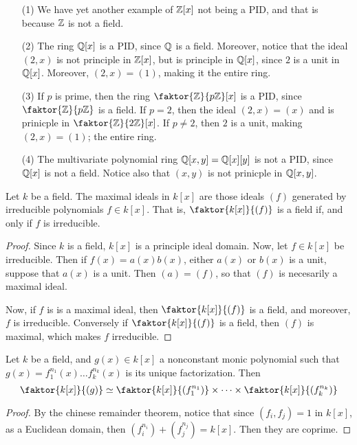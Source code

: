 \begin{example}\label{example_7.7}
  \begin{enumerate}
    \item[(1)] We have yet another example of $\mathbb{Z}[x]$ not being a PID, and
      that is because $\mathbb{Z}$ is not a field.

    \item[(2)] The ring $\mathbb{Q}[x]$ is a PID, since $\mathbb{Q}$ is a field. Moreover,
      notice that the ideal $(2,x)$ is not principle in $\mathbb{Z}[x]$, but is
      principle in $\mathbb{Q}[x]$, since $2$ is a unit in  $\mathbb{Q}[x]$. Moreover,
      $(2,x)=(1)$, making it the entire ring.

    \item[(3)] If $p$ is prime, then the ring  $\faktor{\Z}{p\Z}[x]$ is a
      PID, since $\faktor{\Z}{p\Z}$ is a field. If $p=2$, then the ideal
      $(2,x)=(x)$ and is prinicple in $\faktor{\Z}{2\Z}[x]$. If $p \neq 2$,
      then  $2$ is a unit, making  $(2,x)=(1)$; the entire ring.

    \item[(4)] The multivariate polynomial ring $\mathbb{Q}[x,y]=\mathbb{Q}[x][y]$ is not a
      PID, since $\mathbb{Q}[x]$ is not a field. Notice also that $(x,y)$ is not
      prinicple in $\mathbb{Q}[x,y]$.
  \end{enumerate}
\end{example}

\begin{proposition}\label{proposition_7.4.2}
  Let $k$ be a field. The maximal ideals in $k[x]$ are those ideals $(f)$
  generated by irreducible polynomials $f \in k[x]$. That is,
  $\faktor{k[x]}{(f)}$ is a field if, and only if $f$ is irreducible.
\end{proposition}
\begin{proof}
  Since $k$ is a field, $k[x]$ is a principle ideal domain. Now, let
  $f \in k[x]$ be irreducible. Then if $f(x)=a(x)b(x)$, either
  $a(x)$ or $b(x)$ is a unit, suppose that $a(x)$ is a unit. Then
  $(a)=(f)$, so that $(f)$ is necesarily a maximal ideal.

  Now, if $f$ is is a maximal ideal, then $\faktor{k[x]}{(f)}$ is a
  field, and moreover, $f$ is irreducible. Conversely if
  $\faktor{k[x]}{(f)}$ is a field, then $(f)$ is maximal, which makes
  $f$ irreducible.
\end{proof}

\begin{proposition}\label{proposition_7.4.4}
  Let $k$ be a field, and  $g(x) \in k[x]$ a nonconstant monic polynomial such
  that $g(x)=f_1^{n_1}(x) \dots f_k^{n_k}(x)$ is its unique factorization.
  Then
  \begin{equation*}
    \faktor{k[x]}{(g)} \simeq \faktor{k[x]}{(f_1^{n_1})} \times
    \dots \times \faktor{k[x]}{(f_k^{n_k})}
  \end{equation*}
\end{proposition}
\begin{proof}
  By the chinese remainder theorem, notice that since $(f_i,f_j)=1$ in $k[x]$,
  as a Euclidean domain, then $(f_i^{n_i})+(f_j^{n_j})=k[x]$. Then they are
  coprime.
\end{proof}

